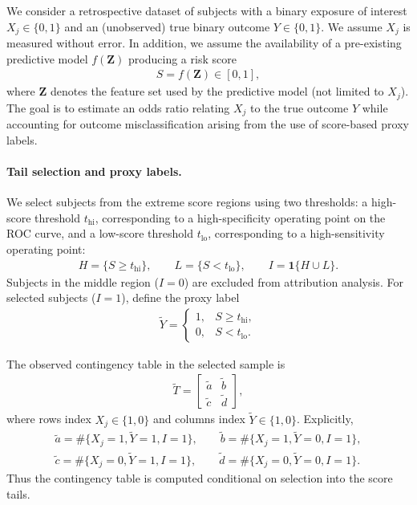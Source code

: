 \documentclass[pdflatex,sn-mathphys-num]{sn-jnl}%
\def\EQSP{3pt}
\newcommand{\cgather}[2][\EQSP]{\begingroup\setlength\abovedisplayskip{#1}\setlength\belowdisplayskip{#1}\begin{gather} #2 \end{gather}\endgroup\noindent}
\theoremstyle{thmstyleone}%
\theoremstyle{thmstyletwo}%
\theoremstyle{thmstylethree}%
\begin{document}
We consider a retrospective dataset of subjects with a binary exposure of interest $X_j\in\{0,1\}$ and an (unobserved) true binary outcome $Y\in\{0,1\}$. We assume $X_j$ is measured without error. In addition, we assume the availability of a pre-existing predictive model $f(\mathbf{Z})$ producing a risk score
\cgather{
S=f(\mathbf{Z})\in[0,1],
}
where $\mathbf{Z}$ denotes the feature set used by the predictive model (not limited to $X_j$). The goal is to estimate an odds ratio relating $X_j$ to the true outcome $Y$ while accounting for outcome misclassification arising from the use of score-based proxy labels.

\paragraph{Tail selection and proxy labels.}
We select subjects from the extreme score regions using two thresholds: a high-score threshold $t_{\mathrm{hi}}$, corresponding to a high-specificity operating point on the ROC curve, and a low-score threshold $t_{\mathrm{lo}}$, corresponding to a high-sensitivity operating point:
\cgather{
H=\{S\ge t_{\mathrm{hi}}\},\qquad
L=\{S<t_{\mathrm{lo}}\},\qquad
I=\mathbf{1}\{H\cup L\}.
}
Subjects in the middle region ($I=0$) are excluded from attribution analysis. For selected subjects ($I=1$), define the proxy label
\cgather{
\tilde Y=
\begin{cases}
1,& S\ge t_{\mathrm{hi}},\\
0,& S<t_{\mathrm{lo}}.
\end{cases}
}

The observed contingency table in the selected sample is
\cgather{
\tilde{T}=
\begin{bmatrix}
\tilde{a} & \tilde{b}\\
\tilde{c} & \tilde{d}
\end{bmatrix},
}
where rows index $X_j\in\{1,0\}$ and columns index $\tilde Y\in\{1,0\}$. Explicitly,
\cgather{
\tilde a=\#\{X_j=1,\tilde Y=1,I=1\},\qquad
\tilde b=\#\{X_j=1,\tilde Y=0,I=1\},\\
\tilde c=\#\{X_j=0,\tilde Y=1,I=1\},\qquad
\tilde d=\#\{X_j=0,\tilde Y=0,I=1\}.
}
Thus the contingency table is computed conditional on selection into the score tails.
\end{document}

